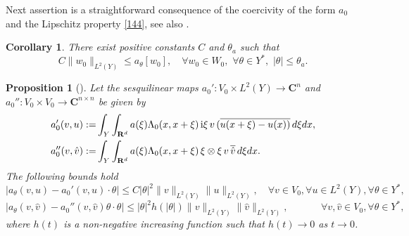 \documentclass[11pt]{article}
\def\rmi{{\rm i}}
\newcommand{\R}{\mathbf{R}}
\newtheorem{proposition}[theorem]{Proposition}
\newtheorem{corollary}[theorem]{Corollary}
\theoremstyle{remark}
\begin{document}
Next assertion is a straightforward consequence of the coercivity of the form $a_0$ and the Lipschitz property \eqref{144}, see also \cite[Proposition 4.1]{CKS2023}.
\begin{corollary}\label{c7.4}
There exist positive constants $C$ and $\theta_a$ such that
\begin{equation*}
C \|w_0\|_{L^2(Y)}  \leq a_\theta[w_0], \quad \forall w_0\in W_0, \,\, \forall \theta \in Y^*,\,\,|\theta|\leq \theta_a.
\end{equation*}
\end{corollary}


\begin{proposition}[{\cite[Hypothesis (H4)]{CKS2023}}]
Let the	sesquilinear maps $a_0': V_0 \times L^2(Y) \to \mathbf C^n$ and $a_0'': V_0 \times V_0 \to \mathbf C^{n\times n}$ be given by
\begin{equation*}
	\begin{aligned}
			a_0'(v,u) :=  &\int_{Y}\int_{\R^d} a(\xi) \Lambda_0(x,x+\xi)\, {\rmi \xi} \,v \,(\overline{u(x+\xi)-u(x))}\,d\xi dx,
		\\
		a_0'' (v, \hat v):= & \int_{Y}\int_{\R^d} a(\xi) \Lambda_0(x,x+\xi) \,\xi \otimes \xi \,v\, \overline{\hat v}\,d\xi dx.
	\end{aligned}
\end{equation*}
The following bounds hold
	\begin{equation}\label{96}
		|	a_\theta( v, u ) - a_0'(v,u)\cdot \theta |\leq C |\theta|^2 \|v\|_{L^2(Y)} \|u\|_{L^2(Y)}, \quad \forall v\in V_0, \forall u\in {L^2(Y)}, \forall \theta\in  Y^*,
	\end{equation}
	\begin{equation}\label{99}
		|a_\theta(v, \hat v) - a_0'' (v, \hat v) \theta\cdot \theta| \leq|\theta|^2 h(|\theta|) \|v\|_{L^2(Y)} \|\hat v\|_{L^2(Y)}, \qquad\quad \,\, \forall v, \hat v \in V_0, \forall \theta\in  Y^*,
	\end{equation}
	where  $h(t)$ is a non-negative increasing function such that $h(t)\to 0$ as $t\to 0$.
\end{proposition}
\end{document}
